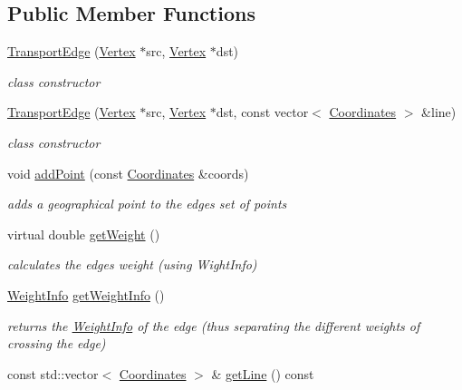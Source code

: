 \subsection*{Public Member Functions}
\begin{DoxyCompactItemize}
\item 
\hyperlink{class_transport_edge_a17138b409239b50080a9401bd1f5d55b}{Transport\+Edge} (\hyperlink{class_vertex}{Vertex} $\ast$src, \hyperlink{class_vertex}{Vertex} $\ast$dst)
\begin{DoxyCompactList}\small\item\em class constructor \end{DoxyCompactList}\item 
\hyperlink{class_transport_edge_a1b92b947e39bf283dfd9288559f44132}{Transport\+Edge} (\hyperlink{class_vertex}{Vertex} $\ast$src, \hyperlink{class_vertex}{Vertex} $\ast$dst, const vector$<$ \hyperlink{class_coordinates}{Coordinates} $>$ \&line)
\begin{DoxyCompactList}\small\item\em class constructor \end{DoxyCompactList}\item 
void \hyperlink{class_transport_edge_aa1da957ea215ff6ec5aa6dc8132eb381}{add\+Point} (const \hyperlink{class_coordinates}{Coordinates} \&coords)
\begin{DoxyCompactList}\small\item\em adds a geographical point to the edge\textquotesingle{}s set of points \end{DoxyCompactList}\item 
virtual double \hyperlink{class_transport_edge_ad2b8f66adec9223e97752ae1fb621c0e}{get\+Weight} ()
\begin{DoxyCompactList}\small\item\em calculates the edge\textquotesingle{}s weight (using Wight\+Info) \end{DoxyCompactList}\item 
\hyperlink{class_weight_info}{Weight\+Info} \hyperlink{class_transport_edge_a0087341702150f0cd7fe35c667222ee8}{get\+Weight\+Info} ()
\begin{DoxyCompactList}\small\item\em returns the \hyperlink{class_weight_info}{Weight\+Info} of the edge (thus separating the different weights of crossing the edge) \end{DoxyCompactList}\item 
const std\+::vector$<$ \hyperlink{class_coordinates}{Coordinates} $>$ \& \hyperlink{class_transport_edge_a9332ec7a11cd5d9b5f01df7422a8a178}{get\+Line} () const 

\end{DoxyCompactItemize}
